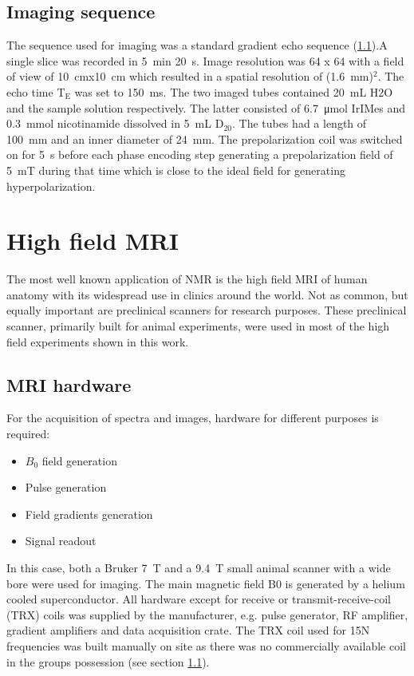         \subsection{Imaging sequence}
        The sequence used for imaging was a standard gradient echo sequence (\ref{}).A single slice was recorded in \SI{5}{\minute} \SI{20}{\second}. Image resolution was 64 x 64 with a field of view of \SI{10}{\cm}x\SI{10}{\cm} which resulted in a spatial resolution of (\SI{1.6}{\mm})$^2$. The echo time $\mathrm{T_E}$ was set to \SI{150}{\milli\second}. The two imaged tubes contained \SI{20}{\milli\liter} H2O and the sample solution respectively. The latter consisted of \SI{6.7}{\micro\mole} IrIMes and \SI{0.3}{\milli\mole} nicotinamide dissolved in \SI{5}{\milli\liter} $\mathrm{D_20}$. The tubes had a length of \SI{100}{\milli\meter} and an inner diameter of \SI{24}{\milli\meter}. The prepolarization coil was switched on for \SI{5}{\second} before each phase encoding step generating a prepolarization field of \SI{5}{\milli\tesla} during that time which is close to the ideal field for generating hyperpolarization.
    \section{High field MRI}
        The most well known application of NMR is the high field MRI of human anatomy with its widespread use in clinics around the world. Not as common, but equally important are preclinical scanners for research purposes. These preclinical scanner, primarily built for animal experiments, were used in most of the high field experiments shown in this work.  \subsection{MRI hardware}
            For the acquisition of spectra and images, hardware for different purposes is required:
            \begin{itemize}
            \item $B_0$ field generation
            \item Pulse generation
            \item Field gradients generation
            \item Signal readout
            \end{itemize}
            In this case, both a Bruker \SI{7}{\tesla} and a \SI{9.4}{\tesla} small animal scanner with a wide bore were used for imaging. The main magnetic field B0 is generated by a helium cooled superconductor. All hardware except for receive or transmit-receive-coil (TRX) coils was supplied by the manufacturer, e.g. pulse generator, RF amplifier, gradient amplifiers and data acquisition crate. The TRX coil used for 15N frequencies was built manually on site as there was no commercially available coil in the groups possession (see section \ref{}).

